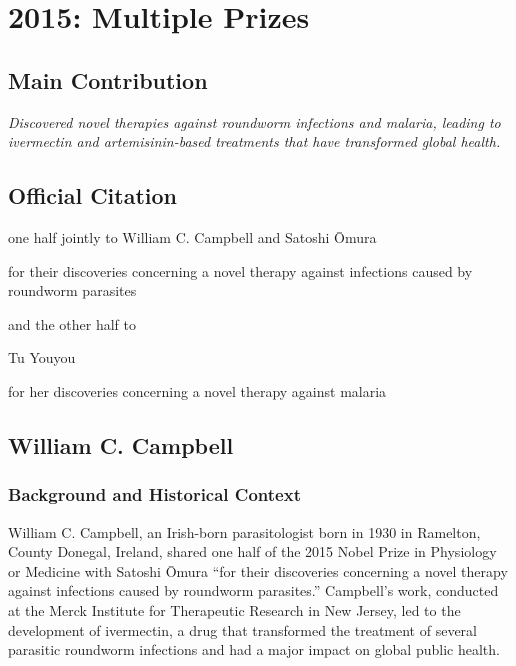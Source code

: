 \chapter[2015 --- Prizes]{2015: Multiple Prizes}
\label{ch:2015_Campbell}

\section*{Main Contribution}

\textit{Discovered novel therapies against roundworm infections and malaria, leading to ivermectin and artemisinin-based treatments that have transformed global health.}\cite{nobel-2015,lecture-2015}

\section{Official Citation}

one half jointly to William C. Campbell and Satoshi \=Omura

for their discoveries concerning a novel therapy against infections caused by roundworm parasites

and the other half to

Tu Youyou

for her discoveries concerning a novel therapy against malaria

\section{William C. Campbell}

\subsection{Background and Historical Context}

William C. Campbell, an Irish-born parasitologist born in 1930 in Ramelton, County Donegal, Ireland, shared one half of the 2015 Nobel Prize in Physiology or Medicine with Satoshi \=Omura ``for their discoveries concerning a novel therapy against infections caused by roundworm parasites.'' Campbell's work, conducted at the Merck Institute for Therapeutic Research in New Jersey, led to the development of ivermectin, a drug that transformed the treatment of several parasitic roundworm infections and had a major impact on global public health.

